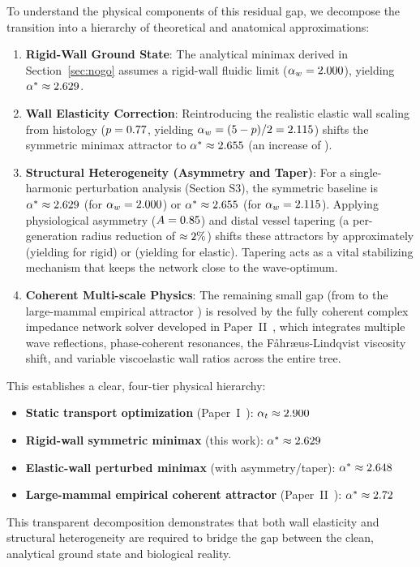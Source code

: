 To understand the physical components of this residual gap, we decompose the
transition into a hierarchy of theoretical and anatomical approximations:
\begin{enumerate}
    \item
\textbf{Rigid-Wall Ground State}: The analytical minimax derived in
Section~\ref{sec:nogo} assumes a rigid-wall fluidic limit ($\alpha_w =
2.000$), yielding $\alpha^* \approx 2.629$.
    \item
\textbf{Wall Elasticity Correction}: Reintroducing the realistic elastic wall
scaling from histology ($p = 0.77$, yielding $\alpha_w = (5-p)/2 =
2.115$) shifts the symmetric minimax attractor to $\alpha^* \approx
2.655$ (an increase of \VarAlphaStarElasticShift).
    \item
\textbf{Structural Heterogeneity (Asymmetry and Taper)}: For a single-harmonic
perturbation analysis (Section S3), the symmetric baseline is $\alpha^* \approx
2.629$ (for $\alpha_w = 2.000$) or $\alpha^* \approx
2.655$ (for $\alpha_w = 2.115$). Applying
physiological asymmetry ($A = 0.85$) and distal vessel tapering
(a per-generation radius reduction of $\approx 2\%$)
shifts these attractors by approximately \VarAlphaHeteroCombinedShift{}
(yielding \VarAlphaHeteroCombined{} for rigid) or
\VarAlphaHeteroCombinedElasticShift{} (yielding \VarAlphaHeteroCombinedElastic{}
for elastic). Tapering acts as a vital stabilizing mechanism that keeps the
network close to the wave-optimum.
    \item
\textbf{Coherent Multi-scale Physics}: The remaining small gap (from
\VarAlphaHeteroCombinedElastic{} to the large-mammal empirical attractor
\VarAlphaStar) is resolved by the fully coherent complex impedance network
solver developed in Paper~II~\cite{paperII}, which integrates multiple wave
reflections, phase-coherent resonances, the Fåhræus-Lindqvist viscosity shift,
and variable viscoelastic wall ratios across the entire tree.
\end{enumerate}

This establishes a clear, four-tier physical hierarchy:
\begin{itemize}
    \item
\textbf{Static transport optimization} (Paper~I~\cite{paperI}): $\alpha_t
\approx 2.900$
    \item
\textbf{Rigid-wall symmetric minimax} (this work): $\alpha^* \approx
2.629$
    \item
\textbf{Elastic-wall perturbed minimax} (with asymmetry/taper): $\alpha^*
\approx 2.648$
    \item
\textbf{Large-mammal empirical coherent attractor} (Paper~II~\cite{paperII}):
$\alpha^* \approx 2.72$
\end{itemize}
This transparent decomposition demonstrates that both wall elasticity and
structural heterogeneity are required to bridge the gap between the clean,
analytical ground state and biological reality.

